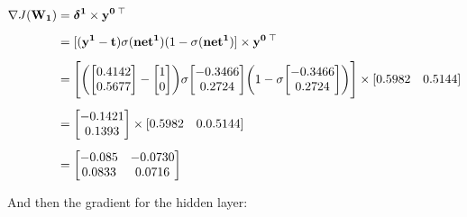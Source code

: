 \documentclass{article}
\begin{document}
\begin{align*}
    \nabla J(\mathbf{W_1}) &= \mathbf{\boldsymbol{\delta}^1} \times \mathbf{y^0} \thinspace ^\top \\[0.5em]
    &= [(\mathbf{y^1}-\mathbf{t})\sigma(\mathbf{net^1})(1-\sigma(\mathbf{net^1})] \times \mathbf{y^0} \thinspace ^\top \\[0.5em]
    &= \Bigg[ \bigg(\bigg[\begin{matrix} 0.4142 \\ 0.5677 \end{matrix}\bigg] - \bigg[\begin{matrix} 1 \\ 0 \end{matrix}\bigg]\bigg)
    \sigma\bigg[\begin{matrix} -0.3466 \\ 0.2724 \end{matrix} \bigg]
    \bigg(1- \sigma\bigg[ \begin{matrix} -0.3466 \\ 0.2724 \end{matrix} \bigg] \bigg) \Bigg] \times 
    [ \begin{matrix} 0.5982 & 0.5144 \end{matrix} ] \\[0.5em]
    &= \bigg[\begin{matrix} -0.1421 \\ 0.1393 \end{matrix}\bigg] \times 
    [ \begin{matrix} 0.5982 & 0.0.5144 \end{matrix} ] \\[0.5em]
    &= \bigg[\begin{matrix} -0.085 & -0.0730 \\ 0.0833 & 0.0716 \end{matrix}\bigg]
\end{align*}


And then the gradient for the hidden layer:
\end{document}
